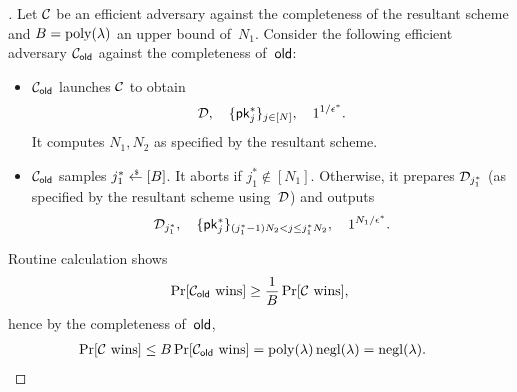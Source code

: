 \begin{proof}[]
Let ${\mathcal{C}}$ be an efficient adversary against the completeness of the resultant scheme and
${B=\operatorname{poly}(\lambda)}$ an upper bound of~$N_1$.
Consider the following efficient adversary $\scriptC_\OLD$ against the completeness of~$\OLD$:
\begin{itemize}
\item $\scriptC_\OLD$ launches ${\mathcal{C}}$ to obtain
\begin{align*}
\scriptD,\quad
\{\pk^\ast_j\}_{j\in[N]},\quad
1^{1/\epsilon^\ast}.
\end{align*}
It computes $N_1,N_2$ as specified by the resultant scheme.
\item $\scriptC_\OLD$ samples ${j^\ast_1\draws[B]}$.
It aborts if ${j^\ast_1\notin[N_1]}$.
Otherwise, it prepares ${\mathcal{D}}_{j^\ast_1}$ (as specified by the resultant scheme using~${\mathcal{D}}$) and outputs
\begin{align*}
\scriptD_{j^\ast_1},\quad
\{\pk^\ast_j\}_{(j^\ast_1-1)N_2<j\leq j^\ast_1N_2},\quad
1^{N_1/\epsilon^\ast}.
\end{align*}
\end{itemize}
Routine calculation shows
\begin{align*}
\Pr[\scriptC_\OLD\textup{ wins}]
\geq
\frac{1}{B}\Pr[\scriptC\textup{ wins}],
\end{align*}
hence by the completeness of~$\OLD$,
\begin{align*}
\Pr[\scriptC\textup{ wins}]
&{}\leq
B\Pr[\scriptC_\OLD\textup{ wins}]
=
\poly(\lambda)\negl(\lambda)
=
\negl(\lambda).
\qedhere
\end{align*}
\end{proof}
